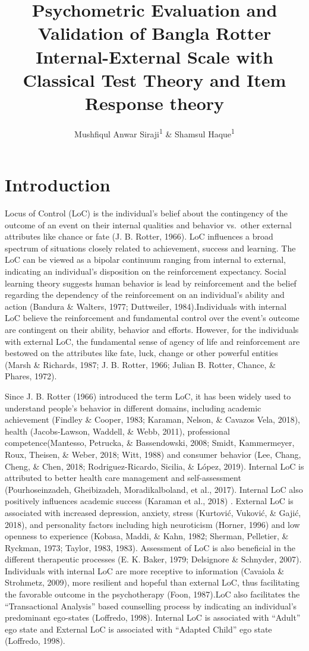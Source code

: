 \documentclass[
  man]{apa6}
\title{Psychometric Evaluation and Validation of Bangla Rotter Internal-External Scale with Classical Test Theory and Item Response theory}
\author{Mushfiqul Anwar Siraji\textsuperscript{1} \& Shamsul Haque\textsuperscript{1}}
\date{}
\affiliation{\vspace{0.5cm}\textsuperscript{1} Monash University, Malaysia}
\begin{document}
\maketitle

\hypertarget{introduction}{%
\section{Introduction}\label{introduction}}

Locus of Control (LoC) is the individual's belief about the contingency of the outcome of an event on their internal qualities and behavior vs.~other external attributes like chance or fate (J. B. Rotter, 1966). LoC influences a broad spectrum of situations closely related to achievement, success and learning. The LoC can be viewed as a bipolar continuum ranging from internal to external, indicating an individual's disposition on the reinforcement expectancy. Social learning theory suggests human behavior is lead by reinforcement and the belief regarding the dependency of the reinforcement on an individual's ability and action (Bandura \& Walters, 1977; Duttweiler, 1984).Individuals with internal LoC believe the reinforcement and fundamental control over the event's outcome are contingent on their ability, behavior and efforts. However, for the individuals with external LoC, the fundamental sense of agency of life and reinforcement are bestowed on the attributes like fate, luck, change or other powerful entities (Marsh \& Richards, 1987; J. B. Rotter, 1966; Julian B. Rotter, Chance, \& Phares, 1972).

Since J. B. Rotter (1966) introduced the term LoC, it has been widely used to understand people's behavior in different domains, including academic achievement (Findley \& Cooper, 1983; Karaman, Nelson, \& Cavazos Vela, 2018), health (Jacobs-Lawson, Waddell, \& Webb, 2011), professional competence(Mantesso, Petrucka, \& Bassendowski, 2008; Smidt, Kammermeyer, Roux, Theisen, \& Weber, 2018; Witt, 1988) and consumer behavior (Lee, Chang, Cheng, \& Chen, 2018; Rodriguez-Ricardo, Sicilia, \& López, 2019). Internal LoC is attributed to better health care management and self-assessment (Pourhoseinzadeh, Gheibizadeh, Moradikalboland, et al., 2017). Internal LoC also positively influences academic success (Karaman et al., 2018) . External LoC is associated with increased depression, anxiety, stress (Kurtović, Vuković, \& Gajić, 2018), and personality factors including high neuroticism (Horner, 1996) and low openness to experience (Kobasa, Maddi, \& Kahn, 1982; Sherman, Pelletier, \& Ryckman, 1973; Taylor, 1983, 1983). Assessment of LoC is also beneficial in the different therapeutic processes (E. K. Baker, 1979; Delsignore \& Schnyder, 2007). Individuals with internal LoC are more receptive to information (Cavaiola \& Strohmetz, 2009), more resilient and hopeful than external LoC, thus facilitating the favorable outcome in the psychotherapy (Foon, 1987).LoC also facilitates the ``Transactional Analysis'' based counselling process by indicating an individual's predominant ego-states (Loffredo, 1998). Internal LoC is associated with ``Adult'' ego state and External LoC is associated with ``Adapted Child'' ego state (Loffredo, 1998).
\end{document}
